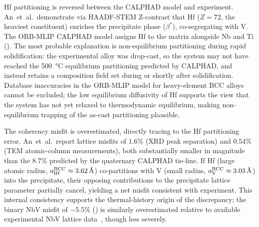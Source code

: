 {\color{blue}
Hf partitioning is reversed between the CALPHAD model and experiment.
An~et~al.\ demonstrate via HAADF-STEM Z-contrast that Hf ($Z = 72$, the heaviest constituent) enriches the precipitate phase ($\beta^*$), co-segregating with V.
The ORB-MLIP CALPHAD model assigns Hf to the matrix alongside Nb and Ti ().
The most probable explanation is non-equilibrium partitioning during rapid solidification: the experimental alloy was drop-cast, so the system may not have reached the \SI{500}{\celsius} equilibrium partitioning predicted by CALPHAD, and instead retains a composition field set during or shortly after solidification.
Database inaccuracies in the ORB-MLIP model for heavy-element BCC alloys cannot be excluded; the low equilibrium diffusivity of Hf supports the view that the system has not yet relaxed to thermodynamic equilibrium, making non-equilibrium trapping of the as-cast partitioning plausible.

The coherency misfit is overestimated, directly tracing to the Hf partitioning error.
An~et~al.\ report lattice misfits of $1.6\%$ (XRD peak separation) and $0.54\%$ (TEM atomic-column measurements), both substantially smaller in magnitude than the $8.7\%$ predicted by the quaternary CALPHAD tie-line.
If Hf (large atomic radius, $a_{\rm Hf}^{\rm BCC} \approx \SI{3.62}{\angstrom}$) co-partitions with V (small radius, $a_{\rm V}^{\rm BCC} \approx \SI{3.03}{\angstrom}$) into the precipitate, their opposing contributions to the precipitate lattice parameter partially cancel, yielding a net misfit consistent with experiment.
This internal consistency supports the thermal-history origin of the discrepancy; the binary NbV misfit of $-5.5\%$ () is similarly overestimated relative to available experimental NbV lattice data~\cite{}, though less severely.

}
